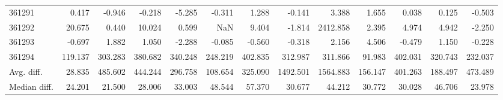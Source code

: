 \begin{tabular}{lrrrrrrrrrrrr}
361291 & 0.417 & -0.946 & -0.218 & -5.285 & -0.311 & 1.288 & -0.141 & 3.388 & 1.655 & 0.038 & 0.125 & -0.503 \\
361292 & 20.675 & 0.440 & 10.024 & 0.599 & NaN & 9.404 & -1.814 & 2412.858 & 2.395 & 4.974 & 4.942 & -2.250 \\
361293 & -0.697 & 1.882 & 1.050 & -2.288 & -0.085 & -0.560 & -0.318 & 2.156 & 4.506 & -0.479 & 1.150 & -0.228 \\
361294 & 119.137 & 303.283 & 380.682 & 340.248 & 248.219 & 402.835 & 312.987 & 311.866 & 91.983 & 402.031 & 320.743 & 232.037 \\
Avg. diff. & 28.835 & 485.602 & 444.244 & 296.758 & 108.654 & 325.090 & 1492.501 & 1564.883 & 156.147 & 401.263 & 188.497 & 473.489 \\
Median diff. & 24.201 & 21.500 & 28.006 & 33.003 & 48.544 & 57.370 & 30.677 & 44.212 & 30.772 & 30.028 & 46.706 & 23.978 \\
\bottomrule
\end{tabular}
